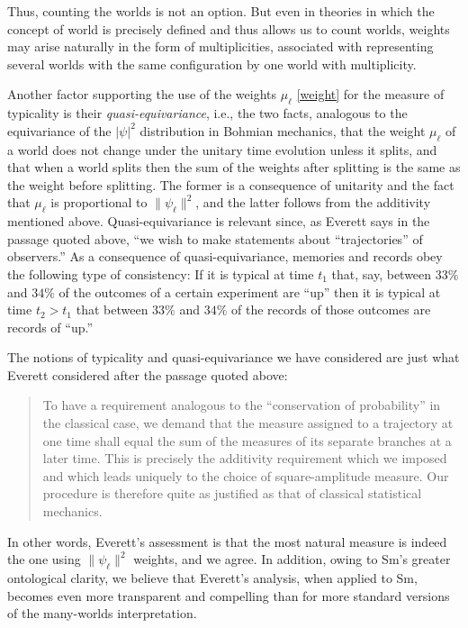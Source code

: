 \documentclass[12pt]{article}
\begin{document}
Thus, counting the worlds is not an option. But even in theories in which the concept of world is precisely defined and thus allows us to count worlds, weights may arise naturally in the form of multiplicities, associated with representing several worlds with the same configuration by one world with multiplicity.

Another factor supporting the use of the weights $\mu_\ell$ \eqref{weight} for the  measure of typicality is their \emph{quasi-equivariance}, i.e., the two facts, analogous to the equivariance of the $|\psi|^2$ distribution in Bohmian mechanics, that the weight $\mu_\ell$ of a world does not change under the unitary time evolution unless it splits, and that when a world splits then the sum of the weights after splitting is the same as the weight before splitting. The former is a consequence of unitarity and the fact that $\mu_\ell$ is proportional to $\|\psi_\ell\|^2$, and the latter follows from the additivity mentioned above. Quasi-equivariance is relevant since, as Everett says in the passage quoted above, ``we wish to make statements about ``trajectories'' of observers.'' As a consequence of quasi-equivariance, memories and records obey the following type of consistency: If it is typical at time $t_1$ that, say, between $33\%$ and $34\%$ of the outcomes of a certain experiment are ``up'' then it is typical at time $t_2>t_1$ that between $33\%$ and $34\%$ of the records of those outcomes are records of ``up.'' 

The notions of typicality and quasi-equivariance we have considered are just what Everett considered after the passage quoted above:
\begin{quote}
To have a requirement analogous to the ``conservation of probability'' in the 
classical case, we demand that the measure assigned to a trajectory at 
one time shall equal the sum of the measures of its separate branches at 
a later time. This is precisely the additivity requirement which we imposed and which leads uniquely to the choice of square-amplitude measure. Our procedure is therefore quite as justified as that of classical statistical mechanics. 
\end{quote}
In other words, Everett's assessment is that the most natural measure is indeed the one using $\|\psi_\ell\|^2$ weights, and we agree. In addition, owing to Sm's greater ontological clarity, we believe that  Everett's analysis, when applied to Sm, becomes even more transparent and compelling than for more standard versions of the many-worlds interpretation.
\end{document}
